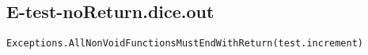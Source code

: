 \subsection{E-test-noReturn.dice.out}
\begin{verbatim}
Exceptions.AllNonVoidFunctionsMustEndWithReturn(test.increment)

\end{verbatim}
